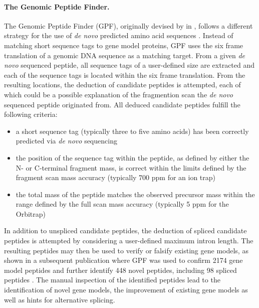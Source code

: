 \paragraph{The Genomic Peptide Finder.}

\label{section:gpf}

The Genomic Peptide Finder (GPF), originally devised by \citeauthor{Allmer2004} 
in \citeyear{Allmer2004}, follows a different strategy for the use of 
{\em de novo} predicted amino acid sequences \citep{Allmer2004}.
Instead of matching short sequence tags to gene model proteins, GPF uses the
six frame translation of a genomic DNA sequence as a matching target.
From a given {\em de novo} sequenced peptide, all sequence tags of a 
user-defined size are extracted and each of the sequence tags is located
within the six frame translation.
From the resulting locations, the deduction of candidate peptides is attempted,
each of which could be a possible explanation of the fragmention scan the
{\em de novo} sequenced peptide originated from.
All deduced candidate peptides fulfill the following criteria:

\begin{itemize}
\item a short sequence tag (typically three to five amino acids) has been 
correctly predicted via {\em de novo} sequencing 
\item the position of the sequence tag within the peptide, as defined by
either the N- or C-terminal fragment mass, is correct within the limits 
defined by the fragment scan mass accuracy (typically 700 ppm for an ion trap)
\item the total mass of the peptide matches the observed precursor mass
within the range defined by the full scan mass accuracy (typically 5 ppm for 
the Orbitrap)
\end{itemize}

In addition to unspliced candidate peptides, the deduction of spliced candidate
peptides is attempted by considering a user-defined maximum intron length.
The resulting peptides may then be used to verify or falsify existing gene 
models, as shown in a subsequent publication where GPF was used to confirm 
2174 gene model peptides and further identify 448 novel peptides, including 98 
spliced peptides \citep{Allmer2006}.
The manual inspection of the identified peptides lead to the identification
of novel gene models, the improvement of existing gene models as well as 
hints for alternative splicing.

